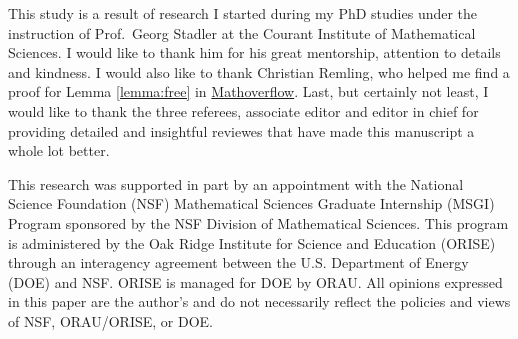 \documentclass[ba]{imsart}
\begin{document}






%


\begin{acks}[Acknowledgments]
  This study is a result of research I started during my PhD studies
  under the instruction of Prof.~Georg Stadler at the Courant
  Institute of Mathematical Sciences. I would like to thank him for
  his great mentorship, attention to details and kindness. I would
  also like to thank Christian Remling, who helped me find a proof for
  Lemma \ref{lemma:free} in
  \href{https://mathoverflow.net/questions/280168/redistribute-diagonal-entries-of-a-matrix/280203#280203c}{Mathoverflow}.
  Last, but certainly not least, I would like to thank the three
  referees, associate editor and editor in chief for providing
  detailed and insightful reviewes that have made this manuscript a
  whole lot better.

  
  This research was supported in part by an appointment with the
  National Science Foundation (NSF) Mathematical Sciences Graduate
  Internship (MSGI) Program sponsored by the NSF Division of
  Mathematical Sciences. This program is administered by the Oak Ridge
  Institute for Science and Education (ORISE) through an interagency
  agreement between the U.S. Department of Energy (DOE) and NSF. ORISE
  is managed for DOE by ORAU. All opinions expressed in this paper are
  the author's and do not necessarily reflect the policies and views
  of NSF, ORAU/ORISE, or DOE.
\end{acks}



\end{document}
